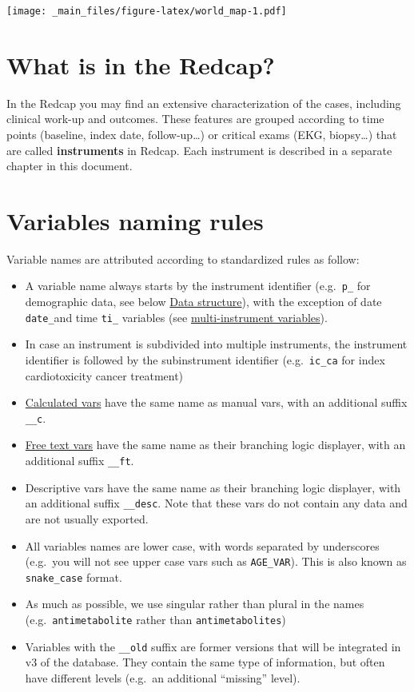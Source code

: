 \documentclass[
]{book}
\providecommand{\tightlist}{%
  \setlength{\itemsep}{0pt}\setlength{\parskip}{0pt}}
\begin{document}
\texttt{[image: \_main\_files/figure-latex/world\_map-1.pdf]}

\hypertarget{what-is-in-the-redcap}{%
\section{What is in the Redcap?}\label{what-is-in-the-redcap}}

In the Redcap you may find an extensive characterization of the cases, including clinical work-up and outcomes. These features are grouped according to time points (baseline, index date, follow-up\ldots) or critical exams (EKG, biopsy\ldots) that are called \textbf{instruments} in Redcap. Each instrument is described in a separate chapter in this document.

\hypertarget{variables-naming-rules}{%
\section{Variables naming rules}\label{variables-naming-rules}}

Variable names are attributed according to standardized rules as follow:

\begin{itemize}
\tightlist
\item
  A variable name always starts by the instrument identifier (e.g.~\texttt{p\_} for demographic data, see below \protect\hyperlink{data_structure}{Data structure}), with the exception of date \texttt{date\_}and time \texttt{ti\_} variables (see \protect\hyperlink{multi_instrument_var}{multi-instrument variables}).
\item
  In case an instrument is subdivided into multiple instruments, the instrument identifier is followed by the subinstrument identifier (e.g.~\texttt{ic\_ca} for index cardiotoxicity cancer treatment)
\item
  \protect\hyperlink{calc_manual_var}{Calculated vars} have the same name as manual vars, with an additional suffix \texttt{\_\_c}.
\item
  \protect\hyperlink{freetext_var}{Free text vars} have the same name as their branching logic displayer, with an additional suffix \texttt{\_\_ft}.
\item
  Descriptive vars have the same name as their branching logic displayer, with an additional suffix \texttt{\_\_desc}. Note that these vars do not contain any data and are not usually exported.
\item
  All variables names are lower case, with words separated by underscores (e.g.~you will not see upper case vars such as \texttt{AGE\_VAR}). This is also known as \texttt{snake\_case} format.
\item
  As much as possible, we use singular rather than plural in the names (e.g.~\texttt{antimetabolite} rather than \texttt{antimetabolites})
\item
  Variables with the \texttt{\_\_old} suffix are former versions that will be integrated in v3 of the database. They contain the same type of information, but often have different levels (e.g.~an additional ``missing'' level).
\end{itemize}
\end{document}
